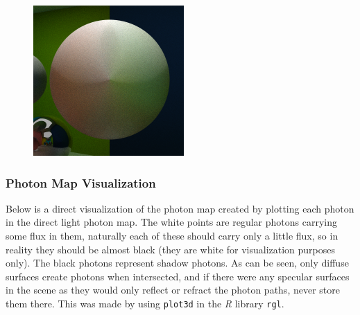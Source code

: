 \documentclass[a4paper, twocolumn]{article}
\begin{document}
            \begin{figure}[H]
                \centering
                \includegraphics[width=0.8\linewidth]{share/new_render_color_bleeding.png}
                \label{fig:render_color_bleeding}
            \end{figure}

            \subsubsection*{Photon Map Visualization}

            Below is a direct visualization of the photon map created by plotting each photon in the direct light photon map. The white points are regular photons carrying some flux in them, naturally each of these should carry only a little flux, so in reality they should be almost black (they are white for visualization purposes only). The black photons represent shadow photons. As can be seen, only diffuse surfaces create photons when intersected, and if there were any specular surfaces in the scene as they would only reflect or refract the photon paths, never store them there. This was made by using \texttt{plot3d} in the \emph{R} library \texttt{rgl}.
\end{document}
